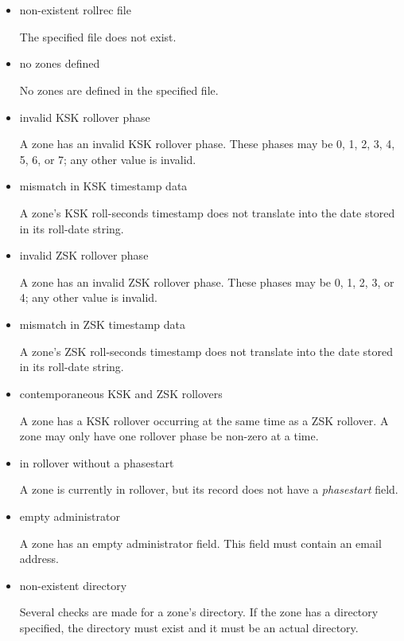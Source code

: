\begin{itemize}

\item non-existent rollrec file\verb" "

The specified  file does not exist.

\item no zones defined\verb" "

No zones are defined in the specified  file.

\item invalid KSK rollover phase\verb" "

A zone has an invalid KSK rollover phase.  These phases may be
0, 1, 2, 3, 4, 5, 6, or 7; any other value is invalid.

\item mismatch in KSK timestamp data\verb" "

A zone's KSK roll-seconds timestamp does not translate into the date stored
in its roll-date string.

\item invalid ZSK rollover phase\verb" "

A zone has an invalid ZSK rollover phase.  These phases may be
0, 1, 2, 3, or 4; any other value is invalid.

\item mismatch in ZSK timestamp data\verb" "

A zone's ZSK roll-seconds timestamp does not translate into the date stored
in its roll-date string.

\item contemporaneous KSK and ZSK rollovers\verb" "

A zone has a KSK rollover occurring at the same time as a ZSK rollover.
A zone may only have one rollover phase be non-zero at a time.

\item in rollover without a phasestart\verb" "

A zone is currently in rollover, but its  record does
not have a {\it phasestart} field.

\item empty administrator\verb" "

A zone has an empty administrator field.  This field must contain an
email address.

\item non-existent directory\verb" "

Several checks are made for a zone's directory.  If the zone has a directory
specified, the directory must exist and it must be an actual directory.


\end{itemize}
